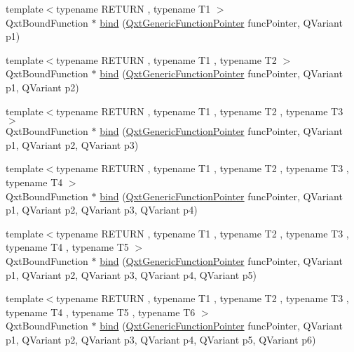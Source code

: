 \begin{DoxyCompactItemize}
\item 
{\footnotesize template$<$typename R\-E\-T\-U\-R\-N , typename T1 $>$ }\\Qxt\-Bound\-Function $\ast$ \hyperlink{namespace_qxt_meta_object_a4208c158dfe24fbf3f075433b56111a1}{bind} (\hyperlink{class_qxt_generic_function_pointer}{Qxt\-Generic\-Function\-Pointer} func\-Pointer, Q\-Variant p1)
\item 
{\footnotesize template$<$typename R\-E\-T\-U\-R\-N , typename T1 , typename T2 $>$ }\\Qxt\-Bound\-Function $\ast$ \hyperlink{namespace_qxt_meta_object_a98c9fd53756a5018bdcbdbd068b9d19c}{bind} (\hyperlink{class_qxt_generic_function_pointer}{Qxt\-Generic\-Function\-Pointer} func\-Pointer, Q\-Variant p1, Q\-Variant p2)
\item 
{\footnotesize template$<$typename R\-E\-T\-U\-R\-N , typename T1 , typename T2 , typename T3 $>$ }\\Qxt\-Bound\-Function $\ast$ \hyperlink{namespace_qxt_meta_object_a566e992cb46ad29349df981df94bc6b8}{bind} (\hyperlink{class_qxt_generic_function_pointer}{Qxt\-Generic\-Function\-Pointer} func\-Pointer, Q\-Variant p1, Q\-Variant p2, Q\-Variant p3)
\item 
{\footnotesize template$<$typename R\-E\-T\-U\-R\-N , typename T1 , typename T2 , typename T3 , typename T4 $>$ }\\Qxt\-Bound\-Function $\ast$ \hyperlink{namespace_qxt_meta_object_ae308c45e47b2cbcf5acd87fd141de5ba}{bind} (\hyperlink{class_qxt_generic_function_pointer}{Qxt\-Generic\-Function\-Pointer} func\-Pointer, Q\-Variant p1, Q\-Variant p2, Q\-Variant p3, Q\-Variant p4)
\item 
{\footnotesize template$<$typename R\-E\-T\-U\-R\-N , typename T1 , typename T2 , typename T3 , typename T4 , typename T5 $>$ }\\Qxt\-Bound\-Function $\ast$ \hyperlink{namespace_qxt_meta_object_a32b309a002250aa8b65ad143f54d4828}{bind} (\hyperlink{class_qxt_generic_function_pointer}{Qxt\-Generic\-Function\-Pointer} func\-Pointer, Q\-Variant p1, Q\-Variant p2, Q\-Variant p3, Q\-Variant p4, Q\-Variant p5)
\item 
{\footnotesize template$<$typename R\-E\-T\-U\-R\-N , typename T1 , typename T2 , typename T3 , typename T4 , typename T5 , typename T6 $>$ }\\Qxt\-Bound\-Function $\ast$ \hyperlink{namespace_qxt_meta_object_a46c2dcedc3baf0ab68b991c5fe7834f9}{bind} (\hyperlink{class_qxt_generic_function_pointer}{Qxt\-Generic\-Function\-Pointer} func\-Pointer, Q\-Variant p1, Q\-Variant p2, Q\-Variant p3, Q\-Variant p4, Q\-Variant p5, Q\-Variant p6)

\end{DoxyCompactItemize}
